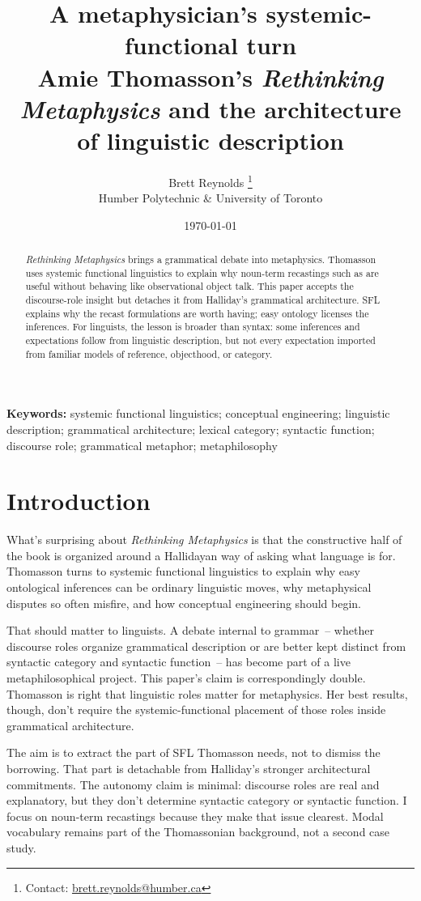 \documentclass[12pt]{article}
\title{A metaphysician's systemic-functional turn\\
{\large Amie Thomasson's \emph{Rethinking Metaphysics} and the architecture of linguistic description}}
\author{Brett Reynolds \orcidlink{0000-0003-0073-7195}%
\thanks{Contact: \href{mailto:brett.reynolds@humber.ca}{brett.reynolds@humber.ca}}\\
Humber Polytechnic \& University of Toronto}
\date{\today}
\begin{document}
\maketitle

\begin{abstract}
 \emph{Rethinking Metaphysics} brings a grammatical debate into metaphysics. Thomasson uses systemic functional linguistics to explain why noun-term recastings such as  are useful without behaving like observational object talk. This paper accepts the discourse-role insight but detaches it from Halliday's grammatical architecture. SFL explains why the recast formulations are worth having; easy ontology licenses the inferences. For linguists, the lesson is broader than syntax: some inferences and expectations follow from linguistic description, but not every expectation imported from familiar models of reference, objecthood, or category.
\end{abstract}

\noindent\textbf{Keywords:} systemic functional linguistics; conceptual engineering; linguistic description; grammatical architecture; lexical category; syntactic function; discourse role; grammatical metaphor; metaphilosophy

\section{Introduction}
What's surprising about  \emph{Rethinking Metaphysics} is that the constructive half of the book is organized around a Hallidayan way of asking what language is for. Thomasson turns to systemic functional linguistics to explain why easy ontological inferences can be ordinary linguistic moves, why metaphysical disputes so often misfire, and how conceptual engineering should begin.

That should matter to linguists. A debate internal to grammar~-- whether discourse roles organize grammatical description or are better kept distinct from syntactic category and syntactic function~-- has become part of a live metaphilosophical project. This paper's claim is correspondingly double. Thomasson is right that linguistic roles matter for metaphysics. Her best results, though, don't require the systemic-functional placement of those roles inside grammatical architecture.

The aim is to extract the part of SFL Thomasson needs, not to dismiss the borrowing. That part is detachable from Halliday's stronger architectural commitments. The autonomy claim is minimal: discourse roles are real and explanatory, but they don't determine syntactic category or syntactic function. I focus on noun-term recastings because they make that issue clearest. Modal vocabulary remains part of the Thomassonian background, not a second case study.
\end{document}
